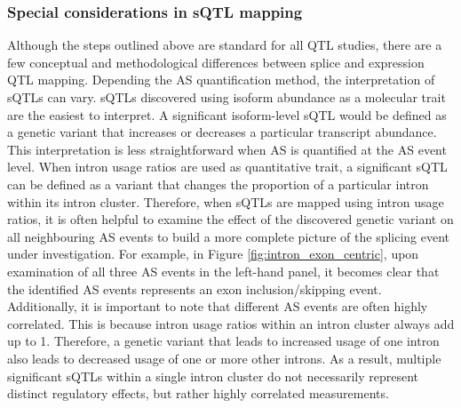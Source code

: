 \subsubsection{Special considerations in sQTL mapping}
Although the steps outlined above are standard for all QTL studies, there are a few conceptual and methodological differences between splice and expression QTL mapping. Depending the AS quantification method, the interpretation of sQTLs can vary. sQTLs discovered using isoform abundance as a molecular trait are the easiest to interpret. A significant isoform-level sQTL would be defined as a genetic variant that increases or decreases a particular transcript abundance. This interpretation is less straightforward when AS is quantified at the AS event level. When intron usage ratios are used as quantitative trait, a significant sQTL can be defined as a variant that changes the proportion of a particular intron within its intron cluster. Therefore, when sQTLs are mapped using intron usage ratios, it is often helpful to examine the effect of the discovered genetic variant on all neighbouring AS events to build a more complete picture of the splicing event under investigation. For example, in Figure \ref{fig:intron_exon_centric}, upon examination of all three AS events in the left-hand panel, it becomes clear that the identified AS events represents an exon inclusion/skipping event. Additionally, it is important to note that different AS events are often highly correlated. This is because intron usage ratios within an intron cluster always add up to 1. Therefore, a genetic variant that leads to increased usage of one intron also leads to decreased usage of one or more other introns. As a result, multiple significant sQTLs within a single intron cluster do not necessarily represent distinct regulatory effects, but rather highly correlated measurements. 
